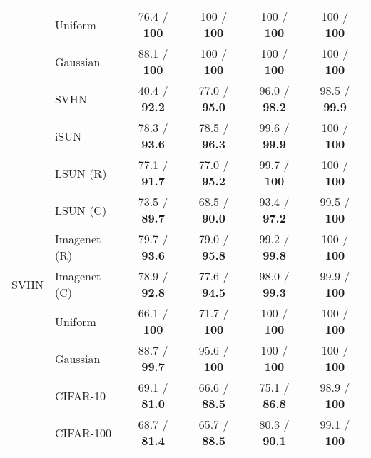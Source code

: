 \documentclass{article}
\begin{document}
\begin{table}[tb]
\begin{tabular}{clcccc}
     & Uniform &   76.4 / \textbf{100} &    100 / \textbf{100} &    100 / \textbf{100} &    100 / \textbf{100} \\
     & Gaussian &   88.1 / \textbf{100} &    100 / \textbf{100} &    100 / \textbf{100} &    100 / \textbf{100} \\
     & SVHN &  40.4 / \textbf{92.2} &  77.0 / \textbf{95.0} &  96.0 / \textbf{98.2} &  98.5 / \textbf{99.9} \\
\midrule
\multirow{9}{*}{SVHN} & iSUN &  78.3 / \textbf{93.6} &  78.5 / \textbf{96.3} &  99.6 / \textbf{99.9} &    100 / \textbf{100} \\
     & LSUN (R) &  77.1 / \textbf{91.7} &  77.0 / \textbf{95.2} &   99.7 / \textbf{100} &    100 / \textbf{100} \\
     & LSUN (C) &  73.5 / \textbf{89.7} &  68.5 / \textbf{90.0} &  93.4 / \textbf{97.2} &   99.5 / \textbf{100} \\
     & Imagenet (R) &  79.7 / \textbf{93.6} &  79.0 / \textbf{95.8} &  99.2 / \textbf{99.8} &    100 / \textbf{100} \\
     & Imagenet (C) &  78.9 / \textbf{92.8} &  77.6 / \textbf{94.5} &  98.0 / \textbf{99.3} &   99.9 / \textbf{100} \\
     & Uniform &   66.1 / \textbf{100} &   71.7 / \textbf{100} &    100 / \textbf{100} &    100 / \textbf{100} \\
     & Gaussian &  88.7 / \textbf{99.7} &   95.6 / \textbf{100} &    100 / \textbf{100} &    100 / \textbf{100} \\
     & CIFAR-10 &  69.1 / \textbf{81.0} &  66.6 / \textbf{88.5} &  75.1 / \textbf{86.8} &   98.9 / \textbf{100} \\
     & CIFAR-100 &  68.7 / \textbf{81.4} &  65.7 / \textbf{88.5} &  80.3 / \textbf{90.1} &   99.1 / \textbf{100} \\
\bottomrule
\end{tabular}
 \end{table}
\end{document}
